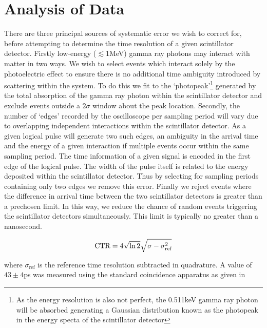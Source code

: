 \section{Analysis of Data}
There are three principal sources of systematic error we wish to correct for, before attempting to determine the time resolution of a given scintillator detector. Firstly low-energy ($\lesssim$1MeV) gamma ray photons may interact with matter in two ways. We wish to select events which interact solely by the photoelectric effect to ensure there is no additional time ambiguity introduced by scattering within the system. To do this we fit to the `photopeak'\footnote{As the energy resolution is also not perfect, the 0.511keV gamma ray photon will be absorbed generating a Gaussian distribution known as the photopeak in the energy specta of the scintillator detector} generated by the total absorption of the gamma ray photon within the scintillator detector and exclude events outside a $2\sigma$ window about the peak location. Secondly, the number of `edges' recorded by the oscilloscope per sampling period will vary due to overlapping independent interactions within the scintillator detector. As a given logical pulse will generate two such edges, an ambiguity in the arrival time and the energy of a given interaction if multiple events occur within the same sampling period. The time information of a given signal is encoded in the first edge of the logical pulse. The width of the pulse itself is related to the energy deposited within the scintillator detector. Thus by selecting for sampling periods containing only two edges we remove this error. Finally we reject events where the difference in arrival time between the two scintillator detectors is greater than a prechosen limit. In this way, we reduce the chance of random events triggering the scintillator detectors simultaneously. This limit is typically no greater than a nanosecond.

\begin{equation}
\text{CTR} = 4\sqrt{\ln{2}}\sqrt{\sigma-\sigma_\textrm{ref}^2}\\
\label{eqn:ctr-quad}
\end{equation}

where $\sigma_\text{ref}$ is the reference time resolution subtracted in quadrature. A value of $43\pm4$ps was measured using the standard coincidence apparatus as given in \cite{ch_Meyer_Pizzichemi_Lecoq_2013}


